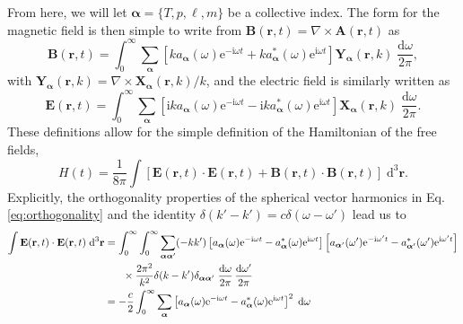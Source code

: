 \documentclass{article}
\numberwithin{equation}{section}
\begin{document}
From here, we will let $\bm{\alpha} = \{T,p,\ell,m\}$ be a collective index. The form for the magnetic field is then simple to write from $\mathbf{B}(\mathbf{r},t) = \nabla\times\mathbf{A}(\mathbf{r},t)$ as
\begin{equation}\label{eq:B1}
\mathbf{B}(\mathbf{r},t) = \int_0^\infty\sum_{\bm{\alpha}}\left[ka_{\bm{\alpha}}(\omega)\mathrm{e}^{-\mathrm{i}\omega t} + ka_{\bm{\alpha}}^*(\omega)\mathrm{e}^{\mathrm{i}\omega t}\right]\mathbf{Y}_{\bm{\alpha}}(\mathbf{r},k)\;\frac{\mathrm{d}\omega}{2\pi},
\end{equation}
with $\mathbf{Y}_{\bm{\alpha}}(\mathbf{r},k) = \nabla\times\mathbf{X}_{\bm{\alpha}}(\mathbf{r},k)/k$, and the electric field is similarly written as
\begin{equation}\label{eq:E1}
\mathbf{E}(\mathbf{r},t) = \int_0^\infty\sum_{\bm{\alpha}}\left[\mathrm{i}ka_{\bm{\alpha}}(\omega)\mathrm{e}^{-\mathrm{i}\omega t} - \mathrm{i}ka^*_{\bm{\alpha}}(\omega)\mathrm{e}^{\mathrm{i}\omega t}\right]\mathbf{X}_{\bm{\alpha}}(\mathbf{r},k)\;\frac{\mathrm{d}\omega}{2\pi}.
\end{equation}
These definitions allow for the simple definition of the Hamiltonian of the free fields,
\begin{equation}
H(t) = \frac{1}{8\pi}\int\left[\mathbf{E}(\mathbf{r},t)\cdot\mathbf{E}(\mathbf{r},t) + \mathbf{B}(\mathbf{r},t)\cdot\mathbf{B}(\mathbf{r},t)\right]\;\mathrm{d}^3\mathbf{r}.
\end{equation}
Explicitly, the orthogonality properties of the spherical vector harmonics in Eq. \eqref{eq:orthogonality} and the identity $\delta(k ' -k') = c\delta(\omega - \omega')$ lead us to
\begin{equation}
\begin{split}
\int\mathbf{E}(\mathbf{r},t)\cdot\mathbf{E}(\mathbf{r},t)\;\mathrm{d}^3\mathbf{r} &= \int_0^\infty\int_0^\infty\sum_{\bm{\alpha}\bm{\alpha}'}(-kk')\left[a_{\bm{\alpha}}(\omega)\mathrm{e}^{-\mathrm{i}\omega t} - a_{\bm{\alpha}}^*(\omega)\mathrm{e}^{\mathrm{i}\omega t}\right]\left[a_{\bm{\alpha}'}(\omega')\mathrm{e}^{-\mathrm{i}\omega' t} - a_{\bm{\alpha}'}^*(\omega')\mathrm{e}^{\mathrm{i}\omega' t}\right]\\
&\hspace{0.05\textwidth}\times\frac{2\pi^2}{k^2}\delta(k - k')\delta_{\bm{\alpha}\bm{\alpha}'}\;\frac{\mathrm{d}\omega}{2\pi}\,\frac{\mathrm{d}\omega'}{2\pi}\\
&= -\frac{c}{2}\int_0^\infty\sum_{\bm{\alpha}}\left[a_{\bm{\alpha}}(\omega)\mathrm{e}^{-\mathrm{i}\omega t} - a_{\bm{\alpha}}^*(\omega)\mathrm{e}^{\mathrm{i}\omega t}\right]^2\;\mathrm{d}\omega
\end{split}
\end{equation}
\end{document}
